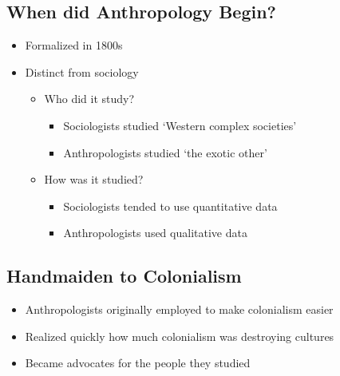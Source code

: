\documentclass[a4paper]{article}
\begin{document}
\subsection{When did Anthropology Begin?}
\begin{itemize}
  \item Formalized in 1800s
  \item Distinct from sociology
  \begin{itemize}
    \item Who did it study?
    \begin{itemize}
      \item Sociologists studied `Western complex societies'
      \item Anthropologists studied `the exotic other'
    \end{itemize}
    \item How was it studied?
    \begin{itemize}
      \item Sociologists tended to use quantitative data
      \item Anthropologists used qualitative data
    \end{itemize}
  \end{itemize}
\end{itemize}

\subsection{Handmaiden to Colonialism}
\begin{itemize}
\item Anthropologists originally employed to make colonialism easier
\item Realized quickly how much colonialism was destroying cultures
\item Became advocates for the people they studied
\end{itemize}
\end{document}
